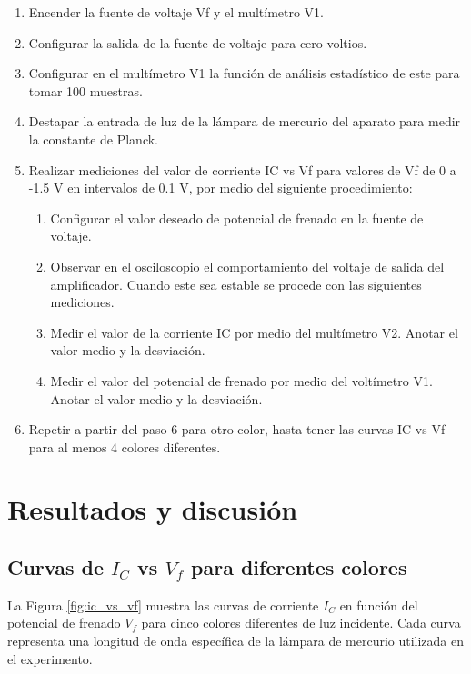 \documentclass[twocolumn,a4paper,11pt]{scrartcl}
\begin{document}
\begin{enumerate}
    \item Encender la fuente de voltaje Vf y el multímetro V1.
    \item Configurar la salida de la fuente de voltaje para cero voltios.
    \item Configurar en el multímetro V1 la función de análisis estadístico de este para tomar 100 muestras.
    \item Destapar la entrada de luz de la lámpara de mercurio del aparato para medir la constante de Planck.
    \item Realizar mediciones del valor de corriente IC vs Vf para valores de Vf de 0 a -1.5 V en intervalos de 0.1 V, por medio del siguiente procedimiento:
    \begin{enumerate}
        \item Configurar el valor deseado de potencial de frenado en la fuente de voltaje.
        \item Observar en el osciloscopio el comportamiento del voltaje de salida del amplificador. Cuando este sea estable se procede con las siguientes mediciones.
        \item Medir el valor de la corriente IC por medio del multímetro V2. Anotar el valor medio y la desviación.
        \item Medir el valor del potencial de frenado por medio del voltímetro V1. Anotar el valor medio y la desviación.
    \end{enumerate}
    \item Repetir a partir del paso 6 para otro color, hasta tener las curvas IC vs Vf para al menos 4 colores diferentes.
\end{enumerate}


\section{Resultados y discusión}

\subsection{Curvas de $I_C$ vs $V_f$ para diferentes colores}

La Figura \ref{fig:ic_vs_vf} muestra las curvas de corriente $I_C$ en función del potencial de frenado $V_f$ para cinco colores diferentes de luz incidente. Cada curva representa una longitud de onda específica de la lámpara de mercurio utilizada en el experimento.
\end{document}
